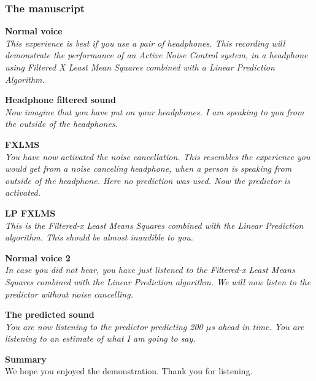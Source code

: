 \subsubsection{The manuscript}


\textbf{Normal voice}\\
\textit{This experience is best if you use a pair of headphones. 
This recording will demonstrate the performance of an Active Noise Control system, in a headphone using Filtered X Least Mean Squares combined with a Linear Prediction Algorithm. }


\textbf{Headphone filtered sound}\\
\textit{Now imagine that you have put on your headphones. I am speaking to you from the outside of the headphones.}

\textbf{FXLMS}\\
\textit{You have now activated the noise cancellation. This resembles the experience you would get from a noise canceling headphone, when a person is speaking from outside of the headphone. 
Here no prediction was used. Now the predictor is activated. }

\textbf{LP FXLMS}\\
\textit{This is the Filtered-x Least Means Squares combined with the Linear Prediction algorithm. This should be almost inaudible to you. }

\textbf{Normal voice 2}\\
\textit{In case you did not hear, you have just listened to the Filtered-x Least Means Squares combined with the Linear Prediction algorithm. We will now listen to the predictor without noise cancelling.}

\textbf{The predicted sound}\\
\textit{You are now listening to the predictor predicting 200 $\mu$s ahead in time. You are listening to an estimate of what I am going to say.}  


\textbf{Summary}\\
We hope you enjoyed the demonstration. Thank you for listening.

%
